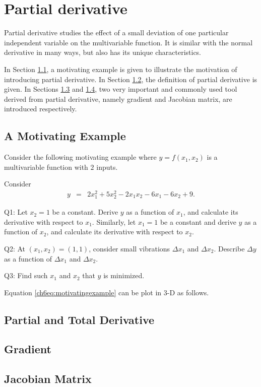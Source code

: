 \chapter{Partial derivative} \label{ch6ch}

Partial derivative studies the effect of a small deviation of one particular independent variable on the multivariable function. It is similar with the normal derivative in many ways, but also has its unique characteristics.

In Section \ref{ch6sec:motivatingexp}, a motivating example is given to illustrate the motivation of introducing partial derivative. In Section \ref{ch6sec:partialtotalderivative}, the definition of partial derivative is given. In Sections \ref{ch6sec:gradient} and \ref{ch6sec:jacobianmatrix}, two very important and commonly used tool derived from partial derivative, namely gradient and Jacobian matrix, are introduced respectively.

\section{A Motivating Example} \label{ch6sec:motivatingexp}

Consider the following motivating example where $y=f(x_1, x_2)$ is a multivariable function with $2$ inputs.

\begin{shortbox}

Consider
\begin{eqnarray}
    y &=& 2x_1^2 + 5x_2^2 -2x_1x_2 - 6x_1 - 6x_2 + 9. \label{ch6eq:motivatingexample}
\end{eqnarray}

Q1: Let $x_2 = 1$ be a constant. Derive $y$ as a function of $x_1$, and calculate its derivative with respect to $x_1$. Similarly, let $x_1 = 1$ be a constant and derive $y$ as a function of $x_2$, and calculate its derivative with respect to $x_2$.

Q2: At $(x_1, x_2) = (1, 1)$, consider small vibrations $\Delta x_1$ and $\Delta x_2$. Describe $\Delta y$ as a function of $\Delta x_1$ and $\Delta x_2$.

Q3: Find such $x_1$ and $x_2$ that $y$ is minimized.

\end{shortbox}

Equation \eqref{ch6eq:motivatingexample} can be plot in 3-D as follows.



\section{Partial and Total Derivative} \label{ch6sec:partialtotalderivative}

\section{Gradient} \label{ch6sec:gradient}

\section{Jacobian Matrix} \label{ch6sec:jacobianmatrix}
